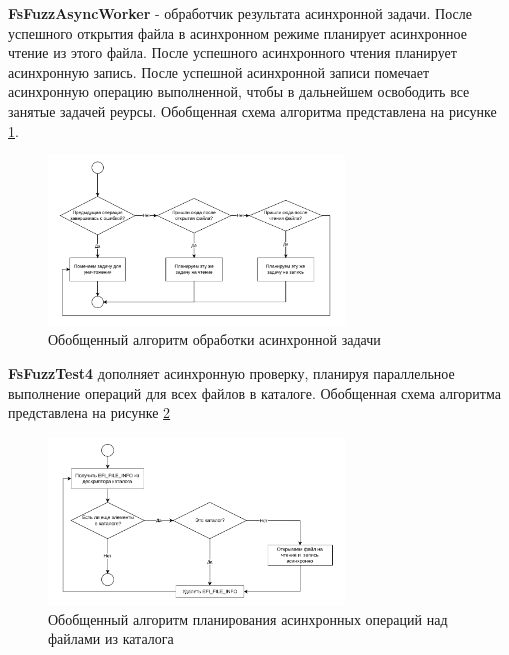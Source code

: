 \textbf{FsFuzzAsyncWorker} - обработчик результата асинхронной задачи. После успешного открытия файла в асинхронном режиме планирует асинхронное чтение из этого файла. После успешного асинхронного чтения планирует асинхронную запись. После успешной асинхронной записи помечает асинхронную операцию выполненной, чтобы в дальнейшем освободить все занятые  задачей реурсы. Обобщенная схема алгоритма представлена на рисунке \ref{met:pic:fsfuzzasyncworker}.
\begin{figure}[h]
	\centering %
	\includegraphics[width=0.7\textwidth]{FsFyzzAsyncWorker.pdf} %
	\caption{Обобщенный алгоритм обработки асинхронной задачи } %
	\label{met:pic:fsfuzzasyncworker} %
\end{figure}

\newpage
\textbf{FsFuzzTest4} дополняет асинхронную проверку, планируя параллельное выполнение операций  для всех файлов в каталоге. Обобщенная схема алгоритма представлена на рисунке \ref{met:pic:fsfuzztestiv}
\begin{figure}[htbp]
	\centering %
	\includegraphics[width=0.7\textwidth]{FsFuzzIV.pdf} %
	\caption{Обобщенный алгоритм планирования асинхронных операций над файлами из каталога } %
	\label{met:pic:fsfuzztestiv} %
\end{figure}

